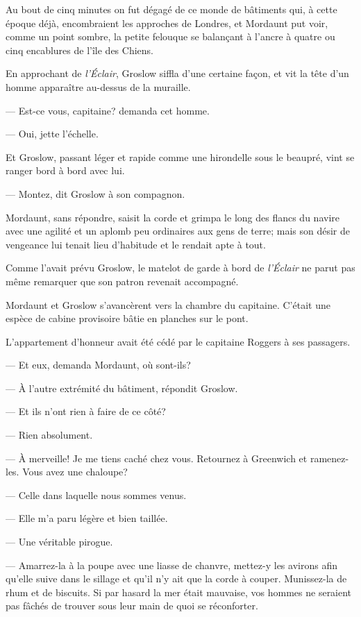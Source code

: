 Au bout de cinq minutes on fut dégagé de ce monde de bâtiments qui, à cette époque déjà, encombraient les approches de Londres, et Mordaunt put voir, comme un point sombre, la petite felouque se balançant à l'ancre à quatre ou cinq encablures de l'île des Chiens.

En approchant de \textit{l'Éclair}, Groslow siffla d'une certaine façon, et vit la tête d'un homme apparaître au-dessus de la muraille.

— Est-ce vous, capitaine? demanda cet homme.

— Oui, jette l'échelle.

Et Groslow, passant léger et rapide comme une hirondelle sous le beaupré, vint se ranger bord à bord avec lui.

— Montez, dit Groslow à son compagnon.

Mordaunt, sans répondre, saisit la corde et grimpa le long des flancs du navire avec une agilité et un aplomb peu ordinaires aux gens de terre; mais son désir de vengeance lui tenait lieu d'habitude et le rendait apte à tout.

Comme l'avait prévu Groslow, le matelot de garde à bord de \textit{l'Éclair} ne parut pas même remarquer que son patron revenait accompagné.

Mordaunt et Groslow s'avancèrent vers la chambre du capitaine. C'était une espèce de cabine provisoire bâtie en planches sur le pont.

L'appartement d'honneur avait été cédé par le capitaine Roggers à ses passagers.

— Et eux, demanda Mordaunt, où sont-ils?

— À l'autre extrémité du bâtiment, répondit Groslow.

— Et ils n'ont rien à faire de ce côté?

— Rien absolument.

— À merveille! Je me tiens caché chez vous. Retournez à Greenwich et ramenez-les. Vous avez une chaloupe?

— Celle dans laquelle nous sommes venus.

— Elle m'a paru légère et bien taillée.

— Une véritable pirogue.

— Amarrez-la à la poupe avec une liasse de chanvre, mettez-y les avirons afin qu'elle suive dans le sillage et qu'il n'y ait que la corde à couper. Munissez-la de rhum et de biscuits. Si par hasard la mer était mauvaise, vos hommes ne seraient pas fâchés de trouver sous leur main de quoi se réconforter.

